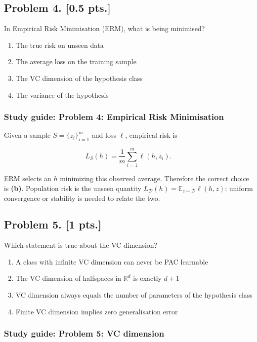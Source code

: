 \documentclass[11pt,a4paper]{article}
\begin{document}
\subsection{Problem 4. [0.5 pts.]}
In Empirical Risk Minimisation (ERM), what is being minimised?
\begin{enumerate}[label=(\alph*)]
    \item The true risk on unseen data
    \item The average loss on the training sample
    \item The VC dimension of the hypothesis class
    \item The variance of the hypothesis
\end{enumerate}


\subsubsection{Study guide: Problem 4: Empirical Risk Minimisation}

Given a sample $S=\{z_i\}_{i=1}^m$ and loss $\ell$, empirical risk is

\[
L_S(h)=\frac{1}{m}\sum_{i=1}^m \ell(h,z_i).
\]

ERM selects an $h$ minimizing this observed average. Therefore the correct choice is \textbf{(b)}. Population risk is the unseen quantity $L_{\mathcal{D}}(h)=\mathbb{E}_{z\sim\mathcal{D}}\ell(h,z)$; uniform convergence or stability is needed to relate the two.



\subsection{Problem 5. [1 pts.]}
Which statement is true about the VC dimension?
\begin{enumerate}[label=(\alph*)]
    \item A class with infinite VC dimension can never be PAC learnable
    \item The VC dimension of halfspaces in $\mathbb{R}^{d}$ is exactly $d + 1$
    \item VC dimension always equals the number of parameters of the hypothesis class
    \item Finite VC dimension implies zero generalisation error
\end{enumerate}


\subsubsection{Study guide: Problem 5: VC dimension}
\end{document}
